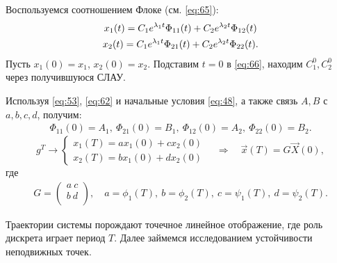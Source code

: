 Воспользуемся соотношением Флоке (см. \eqref{eq:65}):
\begin{gather}
	x_1(t)=C_1 e^{\lambda_1 t}\Phi_{11}(t)+C_2 e^{\lambda_2 t}\Phi_{12}(t) \notag \\ 
	x_2(t)=C_1 e^{\lambda_1 t}\Phi_{21}(t)+C_2 e^{\lambda_2 t}\Phi_{22}(t).	
	\label{eq:66}
\end{gather}
Пусть $x_1(0)=x_1$, $x_2(0)=x_2$. Подставим $t=0$ в \eqref{eq:66}, находим $C_1^0, C_2^0$ через получившуюся СЛАУ. 

Используя \eqref{eq:53}, \eqref{eq:62} и начальные условия \eqref{eq:48}, а также связь  $A,B$ с $a, b, c, d$, получим: 
\begin{gather}
	\Phi_{11}(0)=A_1,~\Phi_{21}(0)=B_1,~\Phi_{12}(0)=A_2,~\Phi_{22}(0)=B_2.	
\end{gather}
\begin{equation}
	g^T\rightarrow
	\left\{\begin{aligned}
		x_1(T)=a x_1(0)+c x_2(0) \\
		x_2(T)=b x_1(0)+d x_2(0)		
	\end{aligned}\right. \quad\Rightarrow\quad
	\vec{x}(T)=G \vec{X}(0),
	\label{eq:68}
\end{equation}
где
\begin{gather*}
	G=
	\begin{pmatrix}
		a ~c \\
		b ~d \\
	\end{pmatrix}
	,\quad
	a=\phi_1(T), ~ b=\phi_2(T), ~
	c=\psi_1(T), ~ d=\psi_2(T).
\end{gather*}

Траектории системы порождают точечное линейное отображение, где роль дискрета играет период $T$. Далее
займемся исследованием устойчивости неподвижных точек. 


